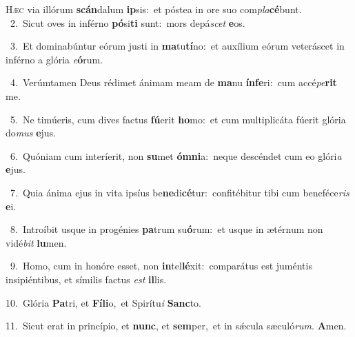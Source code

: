 \lettrine{\initial\textcolor{\initialcolor}{H}}{æc} via illórum \textbf{scán}\-dalum \textbf{ip}\-sis:~\star et póstea in ore suo com\-\textit{pla}\-\textbf{cé}bunt.\\
{\numbfont\textcolor{\numbcolor}{~2.}}~Sicut oves in inférno \textbf{pó}\-si\textbf{ti} sunt:~\star mors depá\textit{scet} \textbf{e}\-os.\par
{\numbfont\textcolor{\numbcolor}{~3.}}~Et dominabúntur eórum justi in \textbf{ma}\-tu\-\textbf{tí}\-no:~\star et auxílium eórum veteráscet in inférno a glória \textit{e}\-\textbf{ó}rum.\par
{\numbfont\textcolor{\numbcolor}{~4.}}~Verúmtamen Deus rédimet ánimam meam de \textbf{ma}\-nu \textbf{ín}\-\textbf{fe}ri:~\star cum accé\-\textit{pe}\-\textbf{rit} me.\par
{\numbfont\textcolor{\numbcolor}{~5.}}~Ne timúeris, cum dives factus \textbf{fú}\-erit \textbf{ho}\-mo:~\star et cum multiplicáta fúerit glória do\textit{mus} \textbf{e}\-jus.\par
{\numbfont\textcolor{\numbcolor}{~6.}}~Quóniam cum interíerit, non \textbf{su}\-met \textbf{óm}\-\textbf{ni}a:~\star neque descéndet cum eo glóri\textit{a} \textbf{e}\-jus.\par
{\numbfont\textcolor{\numbcolor}{~7.}}~Quia ánima ejus in vita ipsíus be\-\textbf{ne}\-di\-\textbf{cé}\-tur:~\star confitébitur tibi cum beneféce\textit{ris} \textbf{e}\-i.\par
{\numbfont\textcolor{\numbcolor}{~8.}}~Introíbit usque in progénies \textbf{pa}\-trum su\-\textbf{ó}\-rum:~\star et usque in ætérnum non vidé\textit{bit} \textbf{lu}\-men.\par
{\numbfont\textcolor{\numbcolor}{~9.}}~Homo, cum in honóre esset, non \textbf{in}\-tel\-\textbf{lé}\-xit:~\star comparátus est juméntis insipiéntibus, et símilis factus \textit{est} \textbf{il}\-lis.\par
{\numbfont\textcolor{\numbcolor}{10.}}~Glória \textbf{Pa}\-tri, et \textbf{Fí}\-\textbf{li}o,~\star et Spirítu\textit{i} \textbf{Sanc}\-to.\par
{\numbfont\textcolor{\numbcolor}{11.}}~Sicut erat in princípio, et \textbf{nunc}\-, et \textbf{sem}\-per,~\star et in sǽcula sæculó\-\textit{rum}\-. \textbf{A}\-men.\par
